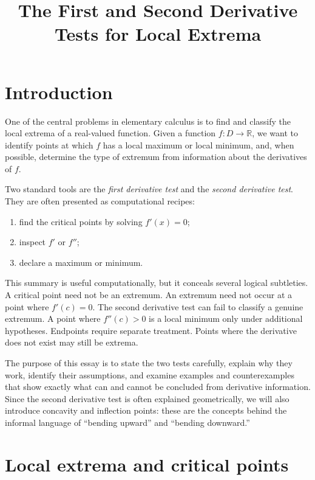 \documentclass{essay}
\title{The First and Second Derivative Tests for Local Extrema}
\author{}
\date{}
\begin{document}
\maketitle
\tableofcontents

\section{Introduction}

One of the central problems in elementary calculus is to find and classify the local extrema of a real-valued function. Given a function \(f : D \to \mathbb{R}\), we want to identify points at which \(f\) has a local maximum or local minimum, and, when possible, determine the type of extremum from information about the derivatives of \(f\).

Two standard tools are the \emph{first derivative test} and the \emph{second derivative test}. They are often presented as computational recipes:

\begin{enumerate}
    \item find the critical points by solving \(f'(x)=0\);
    \item inspect \(f'\) or \(f''\);
    \item declare a maximum or minimum.
\end{enumerate}

This summary is useful computationally, but it conceals several logical subtleties. A critical point need not be an extremum. An extremum need not occur at a point where \(f'(c)=0\). The second derivative test can fail to classify a genuine extremum. A point where \(f''(c)>0\) is a local minimum only under additional hypotheses. Endpoints require separate treatment. Points where the derivative does not exist may still be extrema.

The purpose of this essay is to state the two tests carefully, explain why they work, identify their assumptions, and examine examples and counterexamples that show exactly what can and cannot be concluded from derivative information. Since the second derivative test is often explained geometrically, we will also introduce concavity and inflection points: these are the concepts behind the informal language of ``bending upward'' and ``bending downward.''

\section{Local extrema and critical points}
\end{document}
